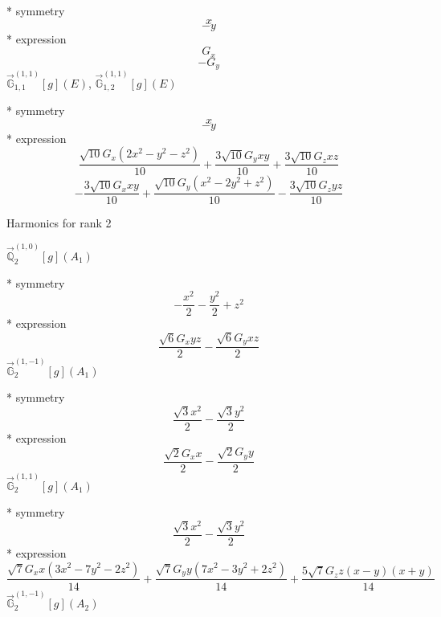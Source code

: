 \documentclass[fleqn,8pt]{jsarticle}
\begin{document}
\noindent\quad ** symmetry
\begin{dmath*}
x
\end{dmath*}
\begin{dmath*}
- y
\end{dmath*}
\noindent\quad ** expression
\begin{dmath*}
G_{x}
\end{dmath*}
\begin{dmath*}
- G_{y}
\end{dmath*}
\noindent\quad $\vec{\mathbb{G}}_{1,1}^{(1,1)}[g](E)$, $\vec{\mathbb{G}}_{1,2}^{(1,1)}[g](E)$

\noindent\quad ** symmetry
\begin{dmath*}
x
\end{dmath*}
\begin{dmath*}
- y
\end{dmath*}
\noindent\quad ** expression
\begin{dmath*}
\frac{\sqrt{10} G_{x} \left(2 x^{2} - y^{2} - z^{2}\right)}{10} + \frac{3 \sqrt{10} G_{y} x y}{10} + \frac{3 \sqrt{10} G_{z} x z}{10}
\end{dmath*}
\begin{dmath*}
- \frac{3 \sqrt{10} G_{x} x y}{10} + \frac{\sqrt{10} G_{y} \left(x^{2} - 2 y^{2} + z^{2}\right)}{10} - \frac{3 \sqrt{10} G_{z} y z}{10}
\end{dmath*}

\noindent * Harmonics for rank 2

\noindent\quad $\vec{\mathbb{Q}}_{2}^{(1,0)}[g](A_{1})$

\noindent\quad ** symmetry
\begin{dmath*}
- \frac{x^{2}}{2} - \frac{y^{2}}{2} + z^{2}
\end{dmath*}
\noindent\quad ** expression
\begin{dmath*}
\frac{\sqrt{6} G_{x} y z}{2} - \frac{\sqrt{6} G_{y} x z}{2}
\end{dmath*}
\noindent\quad $\vec{\mathbb{G}}_{2}^{(1,-1)}[g](A_{1})$

\noindent\quad ** symmetry
\begin{dmath*}
\frac{\sqrt{3} x^{2}}{2} - \frac{\sqrt{3} y^{2}}{2}
\end{dmath*}
\noindent\quad ** expression
\begin{dmath*}
\frac{\sqrt{2} G_{x} x}{2} - \frac{\sqrt{2} G_{y} y}{2}
\end{dmath*}
\noindent\quad $\vec{\mathbb{G}}_{2}^{(1,1)}[g](A_{1})$

\noindent\quad ** symmetry
\begin{dmath*}
\frac{\sqrt{3} x^{2}}{2} - \frac{\sqrt{3} y^{2}}{2}
\end{dmath*}
\noindent\quad ** expression
\begin{dmath*}
\frac{\sqrt{7} G_{x} x \left(3 x^{2} - 7 y^{2} - 2 z^{2}\right)}{14} + \frac{\sqrt{7} G_{y} y \left(7 x^{2} - 3 y^{2} + 2 z^{2}\right)}{14} + \frac{5 \sqrt{7} G_{z} z \left(x - y\right) \left(x + y\right)}{14}
\end{dmath*}
\noindent\quad $\vec{\mathbb{G}}_{2}^{(1,-1)}[g](A_{2})$
\end{document}
